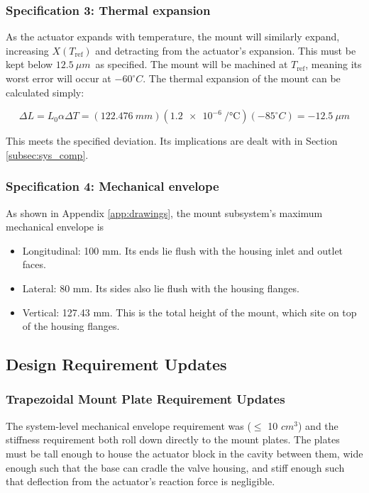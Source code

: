\documentclass[12pt, letterpaper]{report}%
\newcounter{mycounter}           %
\newcounter{sub}[mycounter]      %
\newcommand{\degC}{^{\circ}C}    %
\newcommand{\mountdLTol}{$12.5\ \mu m$}
\begin{document}
        \subsubsection{Specification 3: Thermal expansion}
        \label{subsec:mount_spec_3}

            As the actuator expands with temperature, the mount will similarly expand, increasing $X(T_{\text{ref}})$ and detracting from the actuator's expansion.
            This must be kept below \mountdLTol\ as specified. The mount will be machined at $T_{\text{ref}}$, meaning its worst error will occur at $-60 \degC$.
            The thermal expansion of the mount can be calculated simply:

                $$\Delta L = L_0 \alpha \Delta T = \left( 122.476\ mm \right) \left( \SI{1.2e-6}{\per\celsius} \right) \left( -85 \degC \right) = -12.5\ \mu m$$

            This meets the specified deviation. Its implications are dealt with in Section \ref{subsec:sys_comp}.

        \subsubsection{Specification 4: Mechanical envelope}
        \label{subsec:mount_spec_4}

            As shown in Appendix \ref{app:drawings}, the mount subsystem's maximum mechanical envelope is
            \begin{itemize}
                \item Longitudinal: 100 mm. Its ends lie flush with the housing inlet and outlet faces.
                \item Lateral: 80 mm. Its sides also lie flush with the housing flanges.
                \item Vertical: 127.43 mm. This is the total height of the mount, which site on top of the housing flanges.
            \end{itemize}


       
        \subsection{Design Requirement Updates}
        \subsubsection{Trapezoidal Mount Plate Requirement Updates}
            The system-level mechanical envelope requirement was ($\leq$ 10 $cm^3$) and the stiffness requirement both roll down directly to the mount plates. The plates must be tall enough to house the actuator block in the cavity between them, wide enough such that the base can cradle the valve housing,
            and stiff enough such that deflection from the actuator's reaction force is negligible. 
\end{document}
